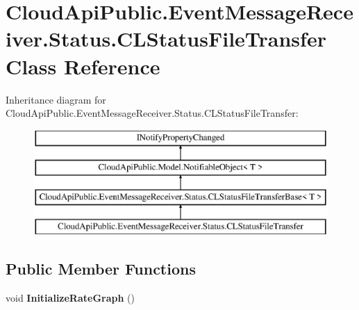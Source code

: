 \hypertarget{class_cloud_api_public_1_1_event_message_receiver_1_1_status_1_1_c_l_status_file_transfer}{\section{Cloud\-Api\-Public.\-Event\-Message\-Receiver.\-Status.\-C\-L\-Status\-File\-Transfer Class Reference}
\label{class_cloud_api_public_1_1_event_message_receiver_1_1_status_1_1_c_l_status_file_transfer}
}
Inheritance diagram for Cloud\-Api\-Public.\-Event\-Message\-Receiver.\-Status.\-C\-L\-Status\-File\-Transfer\-:\begin{figure}[H]
\begin{center}
\leavevmode
\includegraphics[height=4.000000cm]{class_cloud_api_public_1_1_event_message_receiver_1_1_status_1_1_c_l_status_file_transfer}
\end{center}
\end{figure}
\subsection*{Public Member Functions}
\begin{DoxyCompactItemize}
\item 
\hypertarget{class_cloud_api_public_1_1_event_message_receiver_1_1_status_1_1_c_l_status_file_transfer_a515d38e5f4a5478f409a0a4e60d4a7b6}{void {\bfseries Initialize\-Rate\-Graph} ()}\label{class_cloud_api_public_1_1_event_message_receiver_1_1_status_1_1_c_l_status_file_transfer_a515d38e5f4a5478f409a0a4e60d4a7b6}

\end{DoxyCompactItemize}
